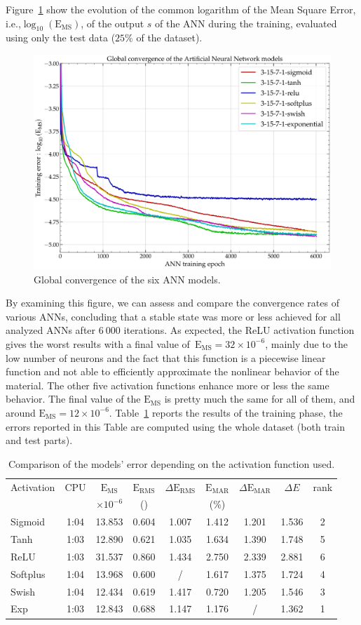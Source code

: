 \documentclass[algorithms,article,submit,pdftex,oneauthors]{Definitions/mdpi}
\makeatletter
\DeclareRobustCommand{\ie}{i.e.,\@\xspace}
\DeclareRobustCommand{\MSE}{\text{E}_\text{MS}}
\DeclareRobustCommand{\RMSE}{\text{E}_\text{RMS}}
\DeclareRobustCommand{\MARE}{\text{E}_\text{MAR}}
\DeclareRobustCommand{\MPa}{\text{MPa}}
\makeatother
\begin{document}
Figure~\ref{fig:ANN-conv} show the evolution of the common logarithm of the Mean Square Error, \ie $\log_{10}(\MSE)$, of the output $s$ of the ANN during the training, evaluated using only the test data ($25\%$ of the dataset).
\begin{figure}[h!]
\centering
\includegraphics[width=0.7\columnwidth]{Figures/3Cr2Mo-convergence}
\caption{Global convergence of the six ANN models.}
\label{fig:ANN-conv}
\end{figure}
By examining this figure, we can assess and compare the convergence rates of various ANNs, concluding that a stable state was more or less achieved for all analyzed ANNs after $6~000$ iterations.
As expected, the ReLU activation function gives the worst results with a final value of~$\MSE=32\times10^{-6}$, mainly due to the low number of neurons and the fact that this function is a piecewise linear function and not able to efficiently approximate the nonlinear behavior of the material.
The other five activation functions enhance more or less the same behavior.
The final value of the $\MSE$ is pretty much the same for all of them, and around $\MSE=12\times10^{-6}$.
Table~\ref{tab:Training} reports the results of the training phase, the errors reported in this Table are computed using the whole dataset (both train and test parts).
\begin{table}[h!]
\caption{Comparison of the models' error depending on the activation function used.\label{tab:Training}}
\begin{tabular}{l|c|c|cc|cc|cc}
\toprule
Activation & CPU & $\MSE$ & $\RMSE$ & $\Delta\RMSE$ & $\MARE$ & $\Delta\MARE$ &  $\Delta E$ & rank \\
 & & $\times 10^{-6}$ & (\MPa) & & (\%) & & &\\ \midrule
Sigmoid & 1:04 & 13.853 & 0.604 & 1.007 & 1.412 & 1.201 & 1.536 & 2\\
Tanh & 1:03 & 12.890 & 0.621 & 1.035 & 1.634 & 1.390 & 1.748 & 5\\
ReLU & 1:03 & 31.537 & 0.860 & 1.434 & 2.750 & 2.339 & 2.881 & 6\\
Softplus & 1:04 & 13.968 & 0.600 & / & 1.617 & 1.375 & 1.724 & 4\\
Swish & 1:04 & 12.434 & 0.619 & 1.417 & 0.720 & 1.205 & 1.546 & 3\\
Exp & 1:03 & 12.843 & 0.688 & 1.147 & 1.176 & / & 1.362 & 1\\
\bottomrule
\end{tabular}
\end{table}
\end{document}
